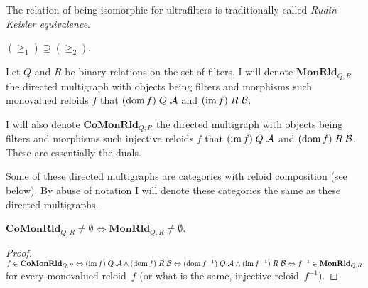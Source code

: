 \begin{rem}
The relation of being isomorphic
for ultrafilters is traditionally called \emph{Rudin-Keisler equivalence}.\end{rem}
\begin{obvious}
$(\ge_{1})\supseteq(\ge_{2})$.\end{obvious}
\begin{defn}
Let $Q$ and $R$ be binary relations on the set of filters. I will
denote $\mathbf{MonRld}_{Q,R}$ the directed multigraph with objects
being filters and morphisms such monovalued reloids $f$ that $(\operatorname{dom} f)\mathrel Q\mathcal{A}$
and $(\operatorname{im} f)\mathrel R\mathcal{B}$.

I will also denote $\mathbf{CoMonRld}_{Q,R}$ the directed multigraph
with objects being filters and morphisms such injective reloids $f$
that $(\operatorname{im} f)\mathrel Q\mathcal{A}$ and $(\operatorname{dom} f)\mathrel R\mathcal{B}$.
These are essentially the duals.
\end{defn}
Some of these directed multigraphs are categories with reloid composition
(see below). By abuse of notation I will denote these categories the
same as these directed multigraphs.

\begin{lem}
$\mathbf{CoMonRld}_{Q,R}\ne\emptyset \Leftrightarrow\mathbf{MonRld}_{Q,R}\ne\emptyset$.
\end{lem}
\begin{proof}
$f\in\mathbf{CoMonRld}_{Q,R} \Leftrightarrow
(\operatorname{im} f)\mathrel Q\mathcal{A} \land (\operatorname{dom} f)\mathrel R\mathcal{B} \Leftrightarrow
(\operatorname{dom} f^{-1})\mathrel Q\mathcal{A} \land (\operatorname{im} f^{-1})\mathrel R\mathcal{B} \Leftrightarrow
f^{-1}\in\mathbf{MonRld}_{Q,R}$ for every monovalued reloid~$f$ (or what is the same, injective reloid~$f^{-1}$).
\end{proof}

